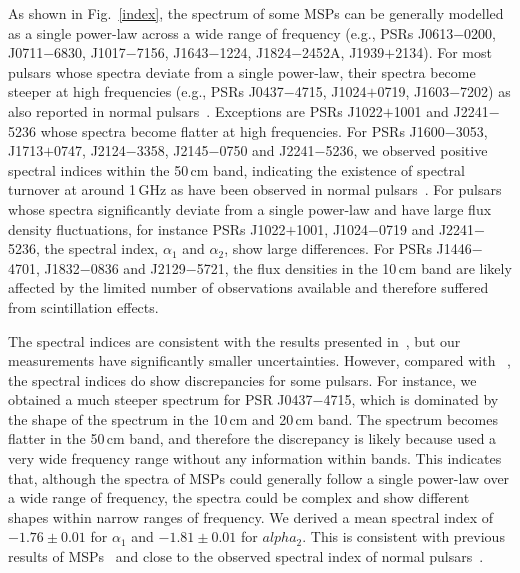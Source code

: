 \documentclass[useAMS,usenatbib]{mn2e}
\begin{document}
As shown in Fig.~\ref{index}, the spectrum of some MSPs can be generally modelled as 
a single power-law across a wide range of frequency (e.g., PSRs J0613$-$0200, J0711$-$6830, 
J1017$-$7156, J1643$-$1224, J1824$-$2452A, J1939$+$2134). 
%
For most pulsars whose spectra deviate from a single power-law, their spectra 
become steeper at high frequencies (e.g., PSRs J0437$-$4715, J1024$+$0719, 
J1603$-$7202) as also reported in normal pulsars~\citep[e.g.,][]{Maron00}.
%
Exceptions are PSRs J1022$+$1001 and J2241$-$5236 whose spectra become flatter at high 
frequencies.
%
For PSRs J1600$-$3053, J1713$+$0747, J2124$-$3358, J2145$-$0750 and J2241$-$5236, we 
observed positive spectral indices within the 50\,cm band, indicating the existence of spectral 
turnover at around 1\,GHz as have been observed in normal pulsars~\citep[e.g.,][]{Kijak11}.
%
For pulsars whose spectra significantly deviate from a single power-law and have large 
flux density fluctuations, for instance PSRs J1022$+$1001, J1024$-$0719  
and J2241$-$5236, the spectral index, $\alpha_1$ and $\alpha_2$, show large 
differences.
%
For PSRs J1446$-$4701, J1832$-$0836 and J2129$-$5721, the flux densities in the 10\,cm 
band are likely affected by the limited number of observations available and therefore 
suffered from scintillation effects.

The spectral indices are consistent with the results presented in~\citet{Toscano98}, 
but our measurements have significantly smaller uncertainties. However, compared with 
~\citet{Kramer99}, the spectral indices do show discrepancies for some pulsars. 
For instance, we obtained a much steeper spectrum for PSR J0437$-$4715, which is 
dominated by the shape of the spectrum in the 10\,cm and 20\,cm band. The spectrum 
becomes flatter in the 50\,cm band, and therefore the discrepancy is likely because
\citet{Kramer99} used a very wide frequency range without any information within 
bands. This indicates that, although the spectra of MSPs could generally follow a 
single power-law over a wide range of frequency, the spectra could be complex and 
show different shapes within narrow ranges of frequency.
%
%
We derived a mean spectral index of $-1.76\pm0.01$ for $\alpha_1$ and $-1.81\pm0.01$ 
for $alpha_2$. This is consistent with previous results of MSPs~\citep{Toscano98,Kramer99} 
and close to the observed spectral index of normal pulsars~\citep{Lorimer95,Maron00}. 
%
\end{document}
